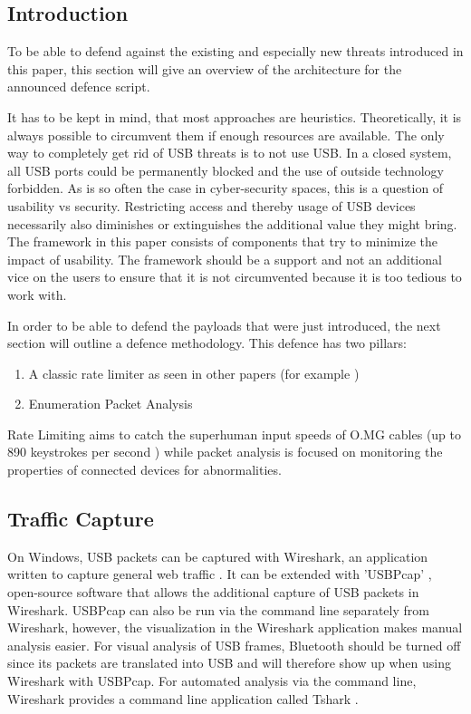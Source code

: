 \subsection{Introduction}

To be able to defend against the existing and especially new threats introduced in this paper, this section will give an overview of the architecture for the announced defence script.

It has to be kept in mind, that most approaches are heuristics. Theoretically, it is always possible to circumvent them if enough resources are available. The only way to completely get rid of USB threats is to not use USB. In a closed system, all USB ports could be permanently blocked and the use of outside technology forbidden. As is so often the case in cyber-security spaces, this is a question of usability vs security. Restricting access and thereby usage of USB devices necessarily also diminishes or extinguishes the additional value they might bring. The framework in this paper consists of components that try to minimize the impact of usability. The framework should be a support and not an additional vice on the users to ensure that it is not circumvented because it is too tedious to work with.  

In order to be able to defend the payloads that were just introduced, the next section will outline a defence methodology.
This defence has two pillars:
\begin{enumerate}
    \item A classic rate limiter as seen in other papers (for example \cite{neunerUSBlockBlockingUSBBased2018} )
    \item Enumeration Packet Analysis
\end{enumerate}

Rate Limiting aims to catch the superhuman input speeds of O.MG cables (up to 890 keystrokes per second \cite{hak5MGCable}) while packet analysis is focused on monitoring the properties of connected devices for abnormalities.


\subsection{Traffic Capture} \label{Traffic Capture}

On Windows, USB packets can be captured with Wireshark, an application written to capture general web traffic \cite{WiresharkGoDeep}. It can be extended with 'USBPcap' \cite{USBPcap}, open-source software that allows the additional capture of USB packets in Wireshark. USBPcap can also be run via the command line separately from Wireshark, however, the visualization in the Wireshark application makes manual analysis easier. For visual analysis of USB frames, Bluetooth should be turned off since its packets are translated into USB and will therefore show up when using Wireshark with USBPcap. For automated analysis via the command line, Wireshark provides a command line application called Tshark \cite{TsharkTsharkDev}. 

